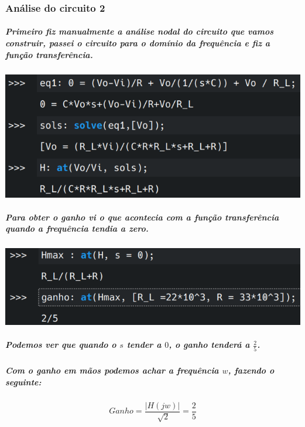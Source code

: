 \documentclass[12pt,twoside, a4paper, twocolumn]{article}
\begin{document}
\subsubsection{Análise do circuito 2}






\subparagraph*{Primeiro fiz manualmente a análise nodal do circuito que vamos construir, passei o circuito para o domínio da frequência e fiz a função transferência.}
\subparagraph*{}


\begin{adjustbox}{scale=0.4}
    \includegraphics{eqs2.png}
\end{adjustbox}




\subparagraph*{Para obter o ganho vi o que acontecia com a função transferência quando a frequência tendia a zero.}
\subparagraph*{}
\begin{adjustbox}{scale=0.4}
    \includegraphics{ganho2.png}
\end{adjustbox}
\subparagraph*{Podemos ver que quando o $s$ tender a $0$, o ganho tenderá a $\frac{2}{5}$.}


\subparagraph*{Com o ganho em mãos podemos achar a frequência $w$, fazendo o seguinte:}


\begin{equation*}
    Ganho = \frac{ | H(jw) |}{\sqrt[]{2}} = \frac{2}{5}
\end{equation*}
\end{document}
